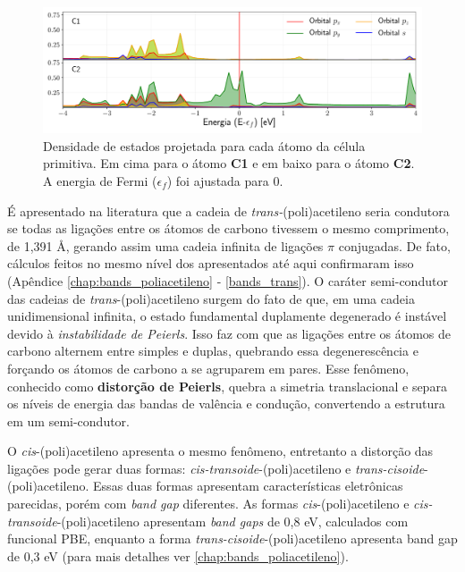 	
	\begin{figure}[!ht]
		\centering
		\includegraphics[width=1.\linewidth]{capitulos/fig/results1/pdos_byatom0}
		\caption{Densidade de estados projetada para cada átomo da célula primitiva. Em cima para o átomo \textbf{C1} e em baixo para o átomo \textbf{C2}. A energia de Fermi ($\epsilon_f$) foi ajustada para 0.}
		\label{pdos_byatom}
	\end{figure}


	É apresentado na literatura que a cadeia de \textit{trans-}(poli)acetileno seria condutora se todas as ligações entre os átomos de carbono tivessem o mesmo comprimento, de 1,391 Å, gerando assim uma cadeia infinita de ligações $\pi$ conjugadas. \cite{suhai1983bond, whangbo1979conjugated} De fato, cálculos feitos no mesmo nível dos apresentados até aqui confirmaram isso (Apêndice \ref{chap:bands_poliacetileno} - \autoref{bands_trans}). O caráter semi-condutor das cadeias de \textit{trans}-(poli)acetileno surgem do fato de que, em uma cadeia unidimensional infinita, o estado fundamental duplamente degenerado é instável devido à \textit{instabilidade de Peierls}\cite{peierls1996quantum}. Isso faz com que as ligações entre os átomos de carbono alternem entre simples e duplas, quebrando essa degenerescência e forçando os átomos de carbono a se agruparem em pares. Esse fenômeno, conhecido como \textbf{distorção de Peierls}, quebra a simetria translacional e separa os níveis de energia das bandas de valência e condução, convertendo a estrutura em um semi-condutor. \cite{peierls1996quantum}
	
	O \textit{cis}-(poli)acetileno apresenta o mesmo fenômeno, entretanto a distorção das ligações pode gerar duas formas: \textit{cis-transoide}-(poli)acetileno e \textit{trans-cisoide}-(poli)acetileno. Essas duas formas apresentam características eletrônicas parecidas, porém com \textit{band gap} diferentes. As formas \textit{cis}-(poli)acetileno e \textit{cis-transoide}-(poli)acetileno apresentam \textit{band gaps} de 0,8 eV, calculados com funcional PBE, enquanto a forma \textit{trans-cisoide}-(poli)acetileno apresenta band gap de 0,3 eV (para mais detalhes ver \autoref{chap:bands_poliacetileno}).
	
